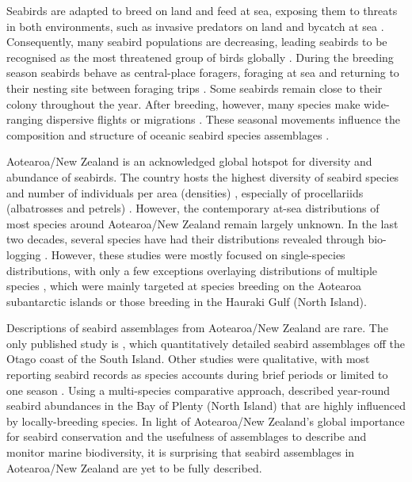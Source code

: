 \documentclass[preprint, 3p, authoryear]{elsarticle} %
\begin{document}
Seabirds are adapted to breed on land and feed at sea, exposing them to threats in both environments, such as invasive predators on land \citep{wanless2007} and bycatch at sea \citep{gianuca2017}. Consequently, many seabird populations are decreasing, leading seabirds to be recognised as the most threatened group of birds globally \citep{dias2019}. During the breeding season seabirds behave as central-place foragers, foraging at sea and returning to their nesting site between foraging trips \citep{schreiber2002book, patterson2022}. Some seabirds remain close to their colony throughout the year. After breeding, however, many species make wide-ranging dispersive flights or migrations \citep[e.g.,][]{shaffer2006, thompson2021}. These seasonal movements influence the composition and structure of oceanic seabird species assemblages \citep{hunt2014, simon2024}.

Aotearoa/New Zealand is an acknowledged global hotspot for diversity and abundance of seabirds. The country hosts the highest diversity of seabird species and number of individuals per area (densities) \citep{karpouzi2007, ramirez2017}, especially of procellariids (albatrosses and petrels) \citep{chown1998, davies2010procellariiformes}. However, the contemporary at-sea distributions of most species around Aotearoa/New Zealand remain largely unknown. In the last two decades, several species have had their distributions revealed through bio-logging \citep[e.g.,][]{shaffer2006, rayner2017, thompson2021, rayner2023}. However, these studies were mostly focused on single-species distributions, with only a few exceptions overlaying distributions of multiple species \citep[e.g.,~see][]{rayner2023}, which were mainly targeted at species breeding on the Aotearoa subantarctic islands or those breeding in the Hauraki Gulf (North Island).

Descriptions of seabird assemblages from Aotearoa/New Zealand are rare. The only published study is \citet{daudt2025}, which quantitatively detailed seabird assemblages off the Otago coast of the South Island. Other studies were qualitative, with most reporting seabird records as species accounts during brief periods or limited to one season \citep[e.g.,][]{hawke1991, odriscoll1998otago}. Using a multi-species comparative approach, \citet{vooren1972} described year-round seabird abundances in the Bay of Plenty (North Island) that are highly influenced by locally-breeding species. In light of Aotearoa/New Zealand's global importance for seabird conservation and the usefulness of assemblages to describe and monitor marine biodiversity, it is surprising that seabird assemblages in Aotearoa/New Zealand are yet to be fully described.
\end{document}
